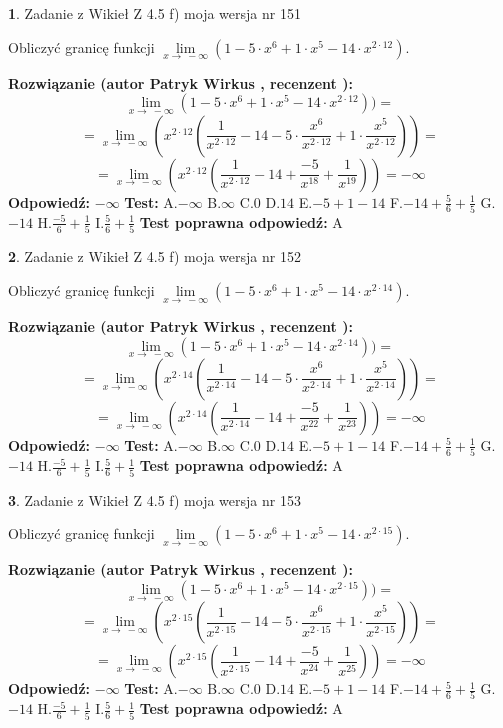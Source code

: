 \documentclass[12pt, a4paper]{article}
\theoremstyle{definition} %
\newtheorem{zad}{}
\newcommand{\zadStart}[1]{\begin{zad}#1\newline}
\newcommand{\zadStop}{\end{zad}}
\newcommand{\rozwStart}[2]{\noindent \textbf{Rozwiązanie (autor #1 , recenzent #2): }\newline}
\newcommand{\rozwStop}{\newline}
\newcommand{\odpStart}{\noindent \textbf{Odpowiedź:}\newline}
\newcommand{\odpStop}{\newline}
\newcommand{\testStart}{\noindent \textbf{Test:}\newline}
\newcommand{\testStop}{\newline}
\newcommand{\kluczStart}{\noindent \textbf{Test poprawna odpowiedź:}\newline}
\newcommand{\kluczStop}{\newline}
\begin{document}
\zadStart{Zadanie z Wikieł Z 4.5 f) moja wersja nr 151}



Obliczyć granicę funkcji  $\lim\limits_{x\to\ -\infty}(1 - 5 \cdot x^{6}+1 \cdot x^{5}- 14 \cdot x^{2\cdot12})$.
\zadStop
\rozwStart{Patryk Wirkus}{}
$$\lim\limits_{x\to\ -\infty}(1 - 5 \cdot x^{6}+1 \cdot x^{5}- 14 \cdot x^{2\cdot12}))=$$
$$=\lim\limits_{x\to\ -\infty}(x^{2\cdot12}(\frac{1}{x^{2\cdot12}}-14 -5 \cdot \frac{x^{6}}{x^{2\cdot12}}+1 \cdot \frac{x^{5}}{x^{2\cdot12}}))=$$
$$=\lim\limits_{x\to\ -\infty}(x^{2\cdot12}(\frac{1}{x^{2\cdot12}}-14 + \frac{-5}{x^{18}}+ \frac{1}{x^{19}}))=-\infty$$
\rozwStop
\odpStart
$-\infty$
\odpStop
\testStart
A.$-\infty$ B.$\infty$ C.$0$ D.$14$ E.$-5 + 1 - 14$
F.$-14+\frac{5}{6}+\frac{1}{5}$ G.$-14$
H.$\frac{-5}{6}+\frac{1}{5}$
I.$\frac{5}{6}+\frac{1}{5}$
\testStop
\kluczStart
A
\kluczStop



\zadStart{Zadanie z Wikieł Z 4.5 f) moja wersja nr 152}



Obliczyć granicę funkcji  $\lim\limits_{x\to\ -\infty}(1 - 5 \cdot x^{6}+1 \cdot x^{5}- 14 \cdot x^{2\cdot14})$.
\zadStop
\rozwStart{Patryk Wirkus}{}
$$\lim\limits_{x\to\ -\infty}(1 - 5 \cdot x^{6}+1 \cdot x^{5}- 14 \cdot x^{2\cdot14}))=$$
$$=\lim\limits_{x\to\ -\infty}(x^{2\cdot14}(\frac{1}{x^{2\cdot14}}-14 -5 \cdot \frac{x^{6}}{x^{2\cdot14}}+1 \cdot \frac{x^{5}}{x^{2\cdot14}}))=$$
$$=\lim\limits_{x\to\ -\infty}(x^{2\cdot14}(\frac{1}{x^{2\cdot14}}-14 + \frac{-5}{x^{22}}+ \frac{1}{x^{23}}))=-\infty$$
\rozwStop
\odpStart
$-\infty$
\odpStop
\testStart
A.$-\infty$ B.$\infty$ C.$0$ D.$14$ E.$-5 + 1 - 14$
F.$-14+\frac{5}{6}+\frac{1}{5}$ G.$-14$
H.$\frac{-5}{6}+\frac{1}{5}$
I.$\frac{5}{6}+\frac{1}{5}$
\testStop
\kluczStart
A
\kluczStop



\zadStart{Zadanie z Wikieł Z 4.5 f) moja wersja nr 153}



Obliczyć granicę funkcji  $\lim\limits_{x\to\ -\infty}(1 - 5 \cdot x^{6}+1 \cdot x^{5}- 14 \cdot x^{2\cdot15})$.
\zadStop
\rozwStart{Patryk Wirkus}{}
$$\lim\limits_{x\to\ -\infty}(1 - 5 \cdot x^{6}+1 \cdot x^{5}- 14 \cdot x^{2\cdot15}))=$$
$$=\lim\limits_{x\to\ -\infty}(x^{2\cdot15}(\frac{1}{x^{2\cdot15}}-14 -5 \cdot \frac{x^{6}}{x^{2\cdot15}}+1 \cdot \frac{x^{5}}{x^{2\cdot15}}))=$$
$$=\lim\limits_{x\to\ -\infty}(x^{2\cdot15}(\frac{1}{x^{2\cdot15}}-14 + \frac{-5}{x^{24}}+ \frac{1}{x^{25}}))=-\infty$$
\rozwStop
\odpStart
$-\infty$
\odpStop
\testStart
A.$-\infty$ B.$\infty$ C.$0$ D.$14$ E.$-5 + 1 - 14$
F.$-14+\frac{5}{6}+\frac{1}{5}$ G.$-14$
H.$\frac{-5}{6}+\frac{1}{5}$
I.$\frac{5}{6}+\frac{1}{5}$
\testStop
\kluczStart
A
\kluczStop
\end{document}
